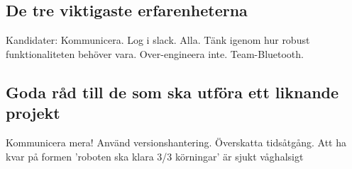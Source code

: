 \documentclass{article}
\begin{document}
\subsection{De tre viktigaste erfarenheterna}

Kandidater:
Kommunicera. Log i slack. Alla.
Tänk igenom hur robust funktionaliteten behöver vara. Over-engineera inte. Team-Bluetooth.


\subsection{Goda råd till de som ska utföra ett liknande projekt}
Kommunicera mera! Använd versionshantering. Överskatta tidsåtgång.
Att ha kvar på formen 'roboten ska klara 3/3 körningar' är sjukt våghalsigt

\nocite{*}
{}

\end{document}
